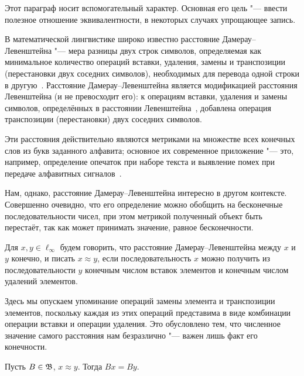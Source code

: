 Этот параграф носит вспомогательный характер.
Основная его цель "--- ввести полезное отношение эквивалентности,
в некоторых случаях упрощающее запись.

В математической лингвистике широко известно расстояние Дамерау--Левенштейна
"---
мера разницы двух строк символов, определяемая как минимальное количество операций вставки,
удаления, замены и транспозиции (перестановки двух соседних символов),
необходимых для перевода одной строки в другую~\cite{damerau1964technique,wagner1974string,gasfield2003strings}.
Расстояние Дамерау--Левенштейна является модификацией расстояния Левенштейна (и не превосходит его):
к операциям вставки, удаления и замены символов, определённых в расстоянии Левенштейна~\cite{levenstein1965binary},
добавлена операция транспозиции (перестановки) двух соседних символов.

Эти расстояния действительно являются метриками на множестве всех конечных слов из букв заданного алфавита;
основное их современное приложение "--- это, например, определение опечаток при наборе текста
и выявление помех при передаче алфавитных сигналов~\cite{oommen1997pattern,brill2000improved,bard2006spelling,li2006exploring}.


Нам, однако, расстояние Дамерау--Левенштейна интересно в другом контексте.
Совершенно очевидно, что его определение можно обобщить на бесконечные последовательности чисел,
при этом метрикой полученный объект быть перестаёт,
так как может принимать значение, равное бесконечности.

\begin{definition}
	\label{def:Damerau_Levenshein_distance}
	Для $x, y \in \ell_\infty$ будем говорить,
	что расстояние Дамерау--Левенштейна между $x$ и $y$ конечно,
	и писать $x\approx y$,
	если последовательность $x$ можно получить из последовательности $y$
	конечным числом вставок элементов и конечным числом удалений элементов.
\end{definition}


	Здесь мы опускаем упоминание операций замены элемента и транспозиции элементов,
	поскольку каждая из этих операций представима в виде комбинации операции вставки и операции удаления.
	Это обусловлено тем, что численное значение самого расстояния нам безразлично "---
	важен лишь факт его конечности.

\begin{lemma}
	Пусть $B\in\mathfrak{B}$, $x\approx y$.
	Тогда $Bx=By$.
\end{lemma}


